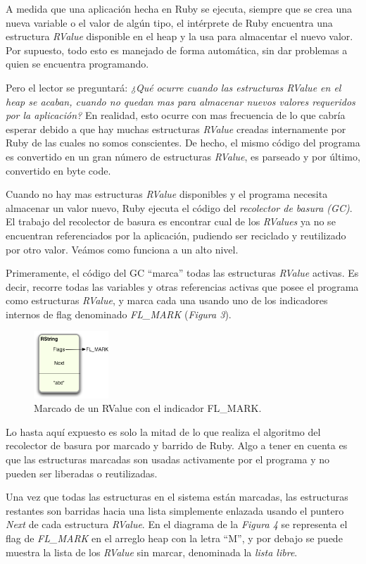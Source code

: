 \documentclass{article}
\begin{document}
	A medida que una aplicación hecha en Ruby se ejecuta, siempre que se crea una nueva variable o el valor de algún tipo, el intérprete de Ruby encuentra una estructura \textit{RValue} disponible en el heap y la usa para almacentar el nuevo valor. Por supuesto, todo esto es manejado de forma automática, sin dar problemas a quien se encuentra programando.
	\par
	Pero el lector se preguntará: \textit{¿Qué ocurre cuando las estructuras RValue en el heap se acaban, cuando no quedan mas para almacenar nuevos valores requeridos por la aplicación?} En realidad, esto ocurre con mas frecuencia de lo que cabría esperar debido a que hay muchas estructuras \textit{RValue} creadas internamente por Ruby de las cuales no somos conscientes. De hecho, el mismo código del programa es convertido en un gran número de estructuras \textit{RValue}, es parseado y por último, convertido en byte code.
	\par
	Cuando no hay mas estructuras \textit{RValue} disponibles y el programa necesita almacenar un valor nuevo, Ruby ejecuta el código del \textit{recolector de basura (GC)}. El trabajo del recolector de basura es encontrar cual de los \textit{RValues} ya no se encuentran referenciados por la aplicación, pudiendo ser reciclado y reutilizado por otro valor. Veámos como funciona a un alto nivel.
	\par
	Primeramente, el código del GC ``marca'' todas las estructuras \textit{RValue} activas. Es decir, recorre todas las variables y otras referencias activas que posee el programa como estructuras \textit{RValue}, y marca cada una usando uno de los indicadores internos de flag denominado \textit{FL\_MARK} (\textit{Figura 3}).
\bigskip

\begin{figure}[h]
	\centering
	\includegraphics[width=0.25\textwidth]{images/gc/gc03-fl-mark.png}
	\caption{Marcado de un RValue con el indicador FL\_MARK.}
\end{figure}
\bigskip
	
	Lo hasta aquí expuesto es solo la mitad de lo que realiza el algoritmo del recolector de basura por marcado y barrido de Ruby. Algo a tener en cuenta es que las estructuras marcadas son usadas activamente por el programa y no pueden ser liberadas o reutilizadas.
	\par
	Una vez que todas las estructuras en el sistema están marcadas, las estructuras restantes son barridas hacia una lista simplemente enlazada usando el puntero \textit{Next} de cada estructura \textit{RValue}. En el diagrama de la \textit{Figura 4} se representa el flag de \textit{FL\_MARK} en el arreglo heap con la letra ``M'', y por debajo se puede muestra la lista de los \textit{RValue} sin marcar, denominada la \textit{lista libre}. 
\end{document}
